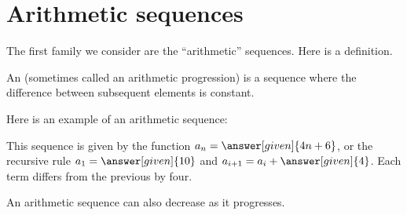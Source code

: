 \documentclass{ximera}
\begin{document}
\section{Arithmetic sequences}


The first family we consider are the ``arithmetic'' sequences.  Here
is a definition.


\begin{definition}
  An  (sometimes called an arithmetic
  progression) is a sequence where the
  difference between subsequent elements is constant.
\end{definition}


\begin{example}
  Here is an example of an arithmetic sequence:
  \begin{image}
  \end{image}
  This sequence is given by the function $a_n=\answer[given]{4n+6}$,
  or the recursive rule $a_1 = \answer[given]{10}$ and $a_{i+1} = a_i
  + \answer[given]{4}$. Each term differs from the previous by four.
\end{example}

An arithmetic sequence can also decrease as it progresses.
\end{document}
